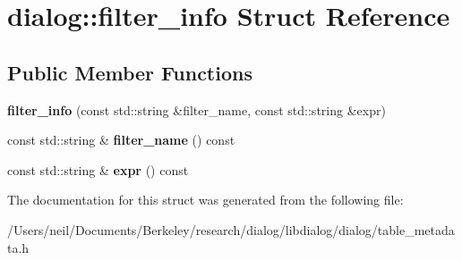 \hypertarget{structdialog_1_1filter__info}{}\section{dialog\+:\+:filter\+\_\+info Struct Reference}
\label{structdialog_1_1filter__info}
\subsection*{Public Member Functions}
\begin{DoxyCompactItemize}
\item 
\mbox{\label{structdialog_1_1filter__info_afe0f7c92613d6091bfc7f50747271a36}} 
{\bfseries filter\+\_\+info} (const std\+::string \&filter\+\_\+name, const std\+::string \&expr)
\item 
\mbox{\label{structdialog_1_1filter__info_a7666f3b27573f261b933fa19e8a7da34}} 
const std\+::string \& {\bfseries filter\+\_\+name} () const
\item 
\mbox{\label{structdialog_1_1filter__info_a0831a4c88388824ebe7d69e43c489677}} 
const std\+::string \& {\bfseries expr} () const
\end{DoxyCompactItemize}


The documentation for this struct was generated from the following file\+:\begin{DoxyCompactItemize}
\item 
/\+Users/neil/\+Documents/\+Berkeley/research/dialog/libdialog/dialog/table\+\_\+metadata.\+h\end{DoxyCompactItemize}

